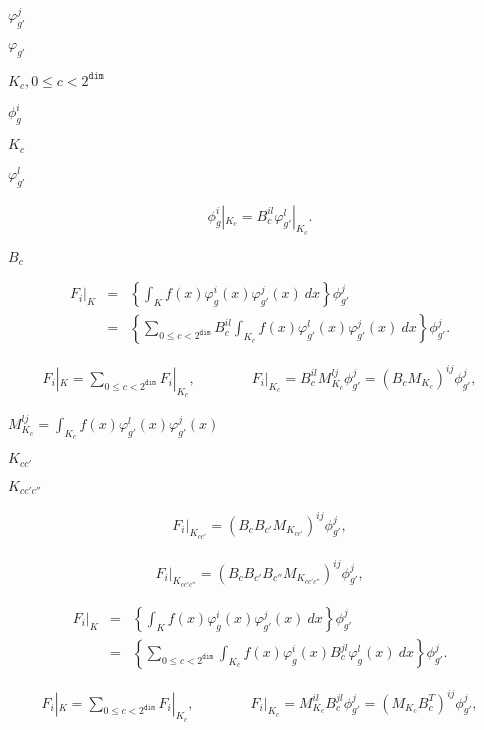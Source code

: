 \documentclass{article}
\begin{document}
$\varphi_{g'}^j$
\pagebreak

$\varphi_{g'}$
\pagebreak

$K_c,0\le c<2^{\texttt{dim}}$
\pagebreak

$\phi_g^i$
\pagebreak

$K_c$
\pagebreak

$\varphi_{g'}^l$
\pagebreak

\begin{eqnarray*} \phi_g^i|_{K_c} = B_c^{il} \varphi_{g'}^l|_{K_c}. \end{eqnarray*}
\pagebreak

$B_c$
\pagebreak

\begin{eqnarray*} F_i|_K &=& \left\{ \int_K f(x) \varphi_g^i(x) \varphi_{g'}^j(x) \ dx \right\} \phi_{g'}^j \\ &=& \left\{ \sum_{0\le c<2^{\texttt{dim}}} B_c^{il} \int_{K_c} f(x) \varphi_{g'}^l(x) \varphi_{g'}^j(x) \ dx \right\} \phi_{g'}^j. \end{eqnarray*}
\pagebreak

\begin{eqnarray*} F_i|_K = \sum_{0\le c<2^{\texttt{dim}}} F_i|_{K_c}, \qquad \qquad F_i|_{K_c} = B_c^{il} M_{K_c}^{lj} \phi_{g'}^j = (B_c M_{K_c})^{ij} \phi_{g'}^j, \end{eqnarray*}
\pagebreak

$M_{K_c}^{lj}=\int_{K_c} f(x) \varphi_{g'}^l(x) \varphi_{g'}^j(x)$
\pagebreak

$K_{cc'}$
\pagebreak

$K_{cc'c''}$
\pagebreak

\begin{eqnarray*} F_i|_{K_{cc'}} = (B_cB_{c'} M_{K_{cc'}})^{ij} \phi_{g'}^j, \end{eqnarray*}
\pagebreak

\begin{eqnarray*} F_i|_{K_{cc'c''}} = (B_c B_{c'} B_{c''}M_{K_{cc'c''}})^{ij} \phi_{g'}^j, \end{eqnarray*}
\pagebreak

\begin{eqnarray*} F_i|_K &=& \left\{ \int_K f(x) \varphi_g^i(x) \varphi_{g'}^j(x) \ dx \right\} \phi_{g'}^j \\ &=& \left\{ \sum_{0\le c<2^{\texttt{dim}}} \int_{K_c} f(x) \varphi_g^i(x) B_c^{jl} \varphi_{g}^l(x) \ dx \right\} \phi_{g'}^j. \end{eqnarray*}
\pagebreak

\begin{eqnarray*} F_i|_K = \sum_{0\le c<2^{\texttt{dim}}} F_i|_{K_c}, \qquad \qquad F_i|_{K_c} = M_{K_c}^{il} B_c^{jl} \phi_{g'}^j = (M_{K_c} B_c^T)^{ij} \phi_{g'}^j, \end{eqnarray*}
\pagebreak
\end{document}
